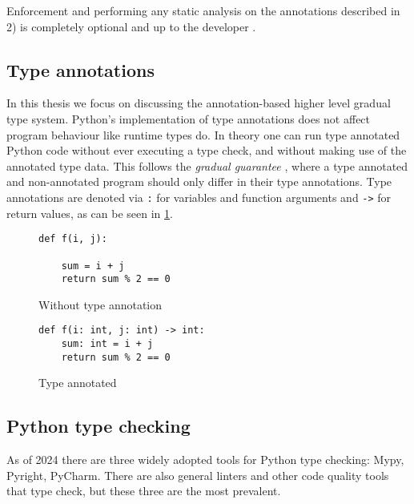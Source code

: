Enforcement and performing any static analysis on the annotations described in 2) is completely optional and up to the developer \cite{python_typing}.

\subsection{Type annotations}
In this thesis we focus on discussing the annotation-based higher level gradual type system. Python's implementation of type annotations does not affect program behaviour like runtime types do. In theory one can run type annotated Python code without ever executing a type check, and without making use of the annotated type data. This follows the \emph{gradual guarantee} \cite{siek_refined_gradual_2015}, where a type annotated and non-annotated program should only differ in their type annotations. Type annotations are denoted via {\tt :} for variables and function arguments and {\tt ->} for return values, as can be seen in \ref{typed_code}.


\begin{figure}[t]
    \centering
     \begin{minipage}{.45\textwidth}
        \centering
        \begin{lstlisting}[linewidth=\textwidth]
def f(i, j):

    sum = i + j
    return sum % 2 == 0
        \end{lstlisting}
        \caption{Without type annotation}
        \label{untyped_code}
    \end{minipage}%
    \begin{minipage}{.45\textwidth}
        \centering
        \begin{lstlisting}[linewidth=\textwidth]
def f(i: int, j: int) -> int:
    sum: int = i + j
    return sum % 2 == 0
        \end{lstlisting}
        \caption{Type annotated}
        \label{typed_code}
    \end{minipage}
\end{figure}

\subsection{Python type checking}

As of 2024 there are three widely adopted tools for Python type checking: Mypy, Pyright, PyCharm. There are also general linters and other code quality tools that type check, but these three are the most prevalent.

